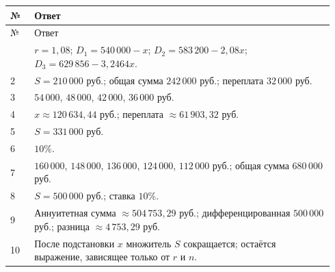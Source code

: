\documentclass[a4paper,12pt]{article}
\newcommand{\sectiontitle}[1]{\vspace{0.4em}{\Large\bfseries\textcolor{darkaccent}{#1}}\par\vspace{0.2em}{\color{accent}\rule{\linewidth}{0.7pt}}\par\vspace{0.45em}}
\begin{document}
\clearpage
\sectiontitle{Ответы}
\begin{longtable}{@{}p{0.07\linewidth}p{0.87\linewidth}@{}}\toprule
№&Ответ\\\midrule\endfirsthead\toprule №&Ответ\\\midrule\endhead\bottomrule\endfoot
1&$r=1{,}08$; $D_1=540\,000-x$; $D_2=583\,200-2{,}08x$; $D_3=629\,856-3{,}2464x$.\\
2&$S=210\,000$ руб.; общая сумма $242\,000$ руб.; переплата $32\,000$ руб.\\
3&$54\,000$, $48\,000$, $42\,000$, $36\,000$ руб.\\
4&$x\approx120\,634{,}44$ руб.; переплата $\approx61\,903{,}32$ руб.\\
5&$S=331\,000$ руб.\\
6&$10\%$.\\
7&$160\,000$, $148\,000$, $136\,000$, $124\,000$, $112\,000$ руб.; общая сумма $680\,000$ руб.\\
8&$S=500\,000$ руб.; ставка $10\%$.\\
9&Аннуитетная сумма $\approx504\,753{,}29$ руб.; дифференцированная $500\,000$ руб.; разница $\approx4\,753{,}29$ руб.\\
10&После подстановки $x$ множитель $S$ сокращается; остаётся выражение, зависящее только от $r$ и $n$.\\
\end{longtable}
\end{document}
